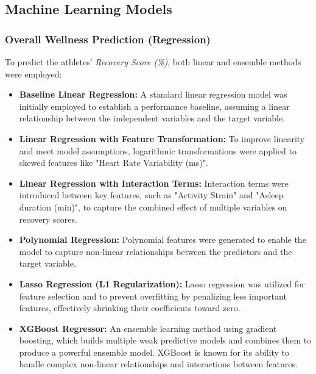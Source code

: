 \documentclass[manuscript,acmsmall,review,screen,authorversion=true]{acmart}
\begin{document}
\subsection{Machine Learning Models}

\subsubsection{Overall Wellness Prediction (Regression)}

To predict the athletes' \textit{Recovery Score (\%)}, both linear and ensemble methods were employed:

\begin{itemize}
    \item \textbf{Baseline Linear Regression:} A standard linear regression model was initially employed to establish a performance baseline, assuming a linear relationship between the independent variables and the target variable.

    \item \textbf{Linear Regression with Feature Transformation:} To improve linearity and meet model assumptions, logarithmic transformations were applied to skewed features like "Heart Rate Variability (ms)".

    \item \textbf{Linear Regression with Interaction Terms:} Interaction terms were introduced between key features, such as "Activity Strain" and "Asleep duration (min)", to capture the combined effect of multiple variables on recovery scores.

    \item \textbf{Polynomial Regression:} Polynomial features were generated to enable the model to capture non-linear relationships between the predictors and the target variable.

    \item \textbf{Lasso Regression (L1 Regularization):} Lasso regression was utilized for feature selection and to prevent overfitting by penalizing less important features, effectively shrinking their coefficients toward zero.

    \item \textbf{XGBoost Regressor:} An ensemble learning method using gradient boosting, which builds multiple weak predictive models and combines them to produce a powerful ensemble model. XGBoost is known for its ability to handle complex non-linear relationships and interactions between features.
\end{itemize}
\end{document}
